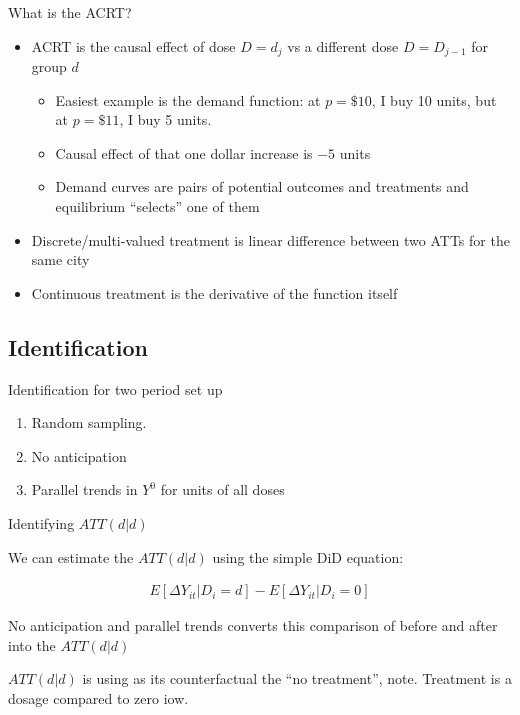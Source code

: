 \documentclass{beamer}
\begin{document}
\begin{frame}{What is the ACRT?}

\begin{itemize}
\item ACRT is the causal effect of dose $D=d_j$ vs a different dose $D=D_{j-1}$ for group $d$
	\begin{itemize}
	\item Easiest example is the demand function: at $p=\$10$, I buy 10 units, but at $p=\$11$, I buy 5 units.  
	\item Causal effect of that one dollar increase is $-5$ units
	\item Demand curves are pairs of potential outcomes and treatments and equilibrium ``selects'' one of them
	\end{itemize}
\item Discrete/multi-valued treatment is linear difference between two ATTs for the same city
\item Continuous treatment is the derivative of the function itself
\end{itemize}

\end{frame}

\subsection{Identification}

\begin{frame}{Identification for two period set up}

\begin{enumerate}

\item Random sampling.  
\item No anticipation
\item Parallel trends in $Y^0$ for units of all doses

\end{enumerate}

\end{frame}

\begin{frame}{Identifying $ATT(d|d)$}

We can estimate the $ATT(d|d)$ using the simple DiD equation:

\begin{eqnarray*}
E [ \Delta Y_{it} | D_i = d] - E[ \Delta Y_{it} | D_i = 0]
\end{eqnarray*}

\bigskip

No anticipation and parallel trends converts this comparison of before and after into the $ATT(d|d)$

\bigskip

$ATT(d|d)$ is using as its counterfactual the ``no treatment'', note.  Treatment is a dosage compared to zero iow.

\end{frame}
\end{document}
